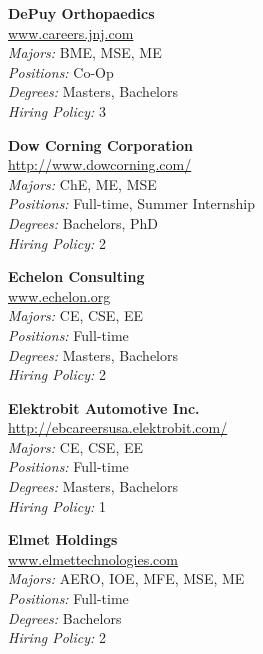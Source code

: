 \documentclass{article}
\begin{document}
\begin{center}
\begin{multicols}{3}
\begin{minipage}{.9\columnwidth}{\Large\bf DePuy Orthopaedics }\\
	\url{www.careers.jnj.com}\\
	\emph{Majors:} BME, MSE, ME\\
	\emph{Positions:} Co-Op\\
	\emph{Degrees:} Masters, Bachelors\\
	\emph{Hiring Policy:} 3\\
\end{minipage}
 
\begin{minipage}{.9\columnwidth}{\Large\bf Dow Corning Corporation }\\
	\url{http://www.dowcorning.com/}\\
	\emph{Majors:} ChE, ME, MSE\\
	\emph{Positions:} Full-time, Summer Internship\\
	\emph{Degrees:} Bachelors, PhD\\
	\emph{Hiring Policy:} 2\\
\end{minipage}
 
\begin{minipage}{.9\columnwidth}{\Large\bf Echelon Consulting }\\
	\url{www.echelon.org}\\
	\emph{Majors:} CE, CSE, EE\\
	\emph{Positions:} Full-time\\
	\emph{Degrees:} Masters, Bachelors\\
	\emph{Hiring Policy:} 2\\
\end{minipage}
 
\begin{minipage}{.9\columnwidth}{\Large\bf Elektrobit Automotive Inc. }\\
	\url{http://ebcareersusa.elektrobit.com/}\\
	\emph{Majors:} CE, CSE, EE\\
	\emph{Positions:} Full-time\\
	\emph{Degrees:} Masters, Bachelors\\
	\emph{Hiring Policy:} 1\\
\end{minipage}
 
\begin{minipage}{.9\columnwidth}{\Large\bf Elmet Holdings }\\
	\url{www.elmettechnologies.com}\\
	\emph{Majors:} AERO, IOE, MFE, MSE, ME\\
	\emph{Positions:} Full-time\\
	\emph{Degrees:} Bachelors\\
	\emph{Hiring Policy:} 2\\
\end{minipage}
 

\end{multicols}
\end{center}
\end{document}
